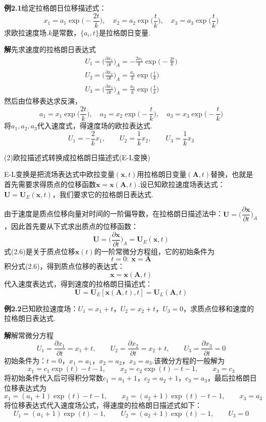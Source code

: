\noindent\textbf{例2.1}\quad 给定拉格朗日位移描述式：
\[
x_1=a_1\exp\Big(-\frac{2t}{k}\Big),\quad x_2=a_2\exp\Big(\frac{t}{k}\Big),\quad x_3=a_3\exp\Big(\frac{t}{k}\Big)
\]
求欧拉速度场.$k$是常数，$\{a_i,t\}$是拉格朗日变量.

\noindent\textbf{解}\quad 先求速度的拉格朗日表达式
\begin{gather*}
U_1=\Big(\frac{\partial x_1}{\partial t}\Big)_{\!A}=-\frac{2a_1}{k}\exp\Big(-\frac{2t}{k}\Big)\\[2pt]
U_2=\Big(\frac{\partial x_2}{\partial t}\Big)_{\!A}=\frac{a_2}{k}\exp\Big(\frac{t}{k}\Big)\\[2pt]
U_3=\Big(\frac{\partial x_3}{\partial t}\Big)_{\!A}=\frac{a_3}{k}\exp\Big(\frac{t}{k}\Big)
\end{gather*}
然后由位移表达求反演，
\[
a_1=x_1\exp\Big(\frac{2t}{k}\Big),\quad a_2=x_2\exp\Big(-\frac{t}{k}\Big),\quad a_3=x_3\exp\Big(-\frac{t}{k}\Big)
\]
将$a_1,a_2,a_3$代入速度式，得速度场的欧拉表达式.
\[
U_1=-\frac{2}{k}x_1,\qquad U_2=\frac{1}{k}x_2,\qquad U_3=\frac{1}{k}x_3
\]

(2)欧拉描述式转换成拉格朗日描述式(E-L变换)

E-L变换是把流场表达式中欧拉变量$(\boldsymbol{x},t)$用拉格朗日变量$(\boldsymbol{A},t)$替换，也就是首先需要求得质点的位移函数$\boldsymbol{x}=\boldsymbol{x}(\boldsymbol{A},t)$.设已知欧拉速度场表达式：$\boldsymbol{U}=\boldsymbol{U}_E(\boldsymbol{x},t)$，我们要求它的拉格朗日表达式.

由于速度是质点位移向量对时间的一阶偏导数，在拉格朗日描述法中：$\boldsymbol{U}=\Big(\dfrac{\partial\boldsymbol{x}}{\partial t}\Big)_{\!A}$，因此首先要从下式求出质点的位移函数：
\begin{equation*}
\boldsymbol{U}=\Big(\frac{\partial\boldsymbol{x}}{\partial t}\Big)_{\!A}=\boldsymbol{U}_E(\boldsymbol{x},t)
\tag{2.6}
\end{equation*}
式(2.6)是关于质点位移$\boldsymbol{x}(t)$的一阶常微分方程组，它的初始条件为
\begin{equation*}
t=0:\ \boldsymbol{x}=\boldsymbol{A}
\tag{2.7}
\end{equation*}
积分式(2.6)，得到质点位移的表达式：
\[
\boldsymbol{x}=\boldsymbol{x}(\boldsymbol{A},t)
\]
代入速度表达式，得到速度的拉格朗日描述式：
\[
\boldsymbol{U}=\boldsymbol{U}_E[\boldsymbol{x}(\boldsymbol{A},t),t]=\boldsymbol{U}_L(\boldsymbol{A},t)
\]

\noindent\textbf{例2.2}\quad 已知欧拉速度场：$U_1=x_1+t$，$U_2=x_2+t$，$U_3=0$，求质点位移和速度的拉格朗日表达式.

\noindent\textbf{解}\quad 解常微分方程
\[
U_1=\frac{\partial x_1}{\partial t}=x_1+t,\qquad U_2=\frac{\partial x_2}{\partial t}=x_2+t,\qquad U_3=\frac{\partial x_3}{\partial t}=0
\]
初始条件为：$t=0$，$x_1=a_1$，$x_2=a_2$，$x_3=a_3$.该微分方程的一般解为
\[
x_1=c_1\exp(t)-t-1,\qquad x_2=c_2\exp(t)-t-1,\qquad x_3=c_3
\]
将初始条件代入后可得积分常数$c_1=a_1+1$，$c_2=a_2+1$，$c_3=a_3$，最后拉格朗日位移表达式为
\[
x_1=(a_1+1)\exp(t)-t-1,\qquad x_2=(a_2+1)\exp(t)-t-1,\qquad x_3=a_3
\]
将位移表达式代入速度场公式，得速度的拉格朗日描述式如下：
\[
U_1=(a_1+1)\exp(t)-1,\qquad U_2=(a_2+1)\exp(t)-1,\qquad U_3=0
\]
